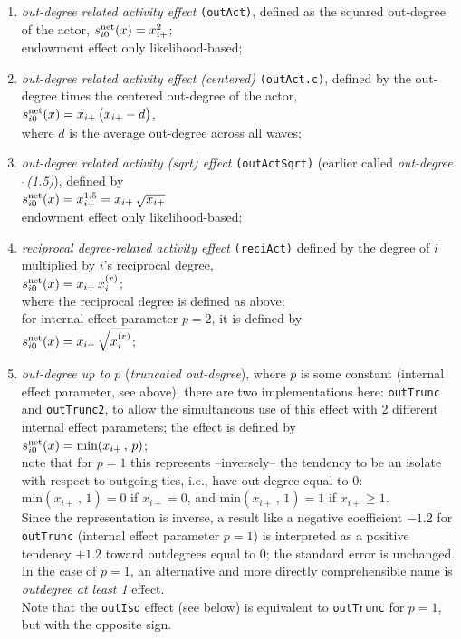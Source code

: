 \documentclass[a4paper,fleqn,11pt]{article}
\newcommand{\+}{\, + \,}
\newcommand{\vit}{\theenumi}
\begin{document}
\begin{enumerate}
 \item {\em out-degree related activity effect} \texttt{(outAct)},
 	 defined as the squared out-degree of the actor,
 $s^{\rm net}_{i\vit}(x) = x^2_{i+}$;\\
 endowment effect only likelihood-based;

 \item {\em out-degree related activity effect (centered)} \texttt{(outAct.c)},
 defined by the out-degree times the centered out-degree of the actor,\\
 $s^{\rm net}_{i\vit}(x) =  x_{i+}\,\big( x_{i+} - d \big)$,\\
 where $d$ is the average out-degree across all waves;

 \item {\em out-degree related activity (sqrt) effect}  \texttt{(outActSqrt)}
 (earlier called {\em out-degree$\,\hat{\ }$(1.5)}), defined by  \\
 $s^{\rm net}_{i\vit}(x) = x^{1.5}_{i+} = x_{i+}\,\sqrt{x_{i+}}$ \\
 endowment effect only likelihood-based;

 \item {\em reciprocal degree-related activity effect} \texttt{(reciAct)}
 defined by the degree of $i$ multiplied by $i$'s reciprocal degree,\\
 $s^{\rm net}_{i\vit}(x) =   x_{i+}\, x^{(r)}_{i} $; \\
 where the reciprocal degree is defined as above;\\
 for internal effect parameter $p=2$, it is defined by\\
 $s^{\rm net}_{i\vit}(x) =   x_{i+}\, \sqrt{x^{(r)}_{i}} $; \\

 \item {\em out-degree up to $p$} (\emph{truncated out-degree}),
 where $p$ is some constant
 (internal effect parameter, see above),  there are two implementations here:
 \texttt{outTrunc} and \texttt{outTrunc2}, to allow the simultaneous use of this
 effect with 2 different internal effect parameters; the effect is
 defined by  \\
 $s^{\rm net}_{i\vit}(x) = \text{min}(x_{i+}\,,\, p)$;\\
 note that for $p=1$ this represents --inversely-- the tendency to be an isolate
 with respect to outgoing ties, i.e., have out-degree equal to 0:
 $ \text{min}(x_{i+}\,,\, 1) = 0$ if $x_{i+} = 0$, and
 $ \text{min}(x_{i+}\,,\, 1) = 1$ if $x_{i+} \geq 1$.\\
 Since the representation is inverse, a result like a negative coefficient
 $ -1.2$ for \texttt{outTrunc} (internal effect parameter $p=1$) is interpreted
 as a positive tendency $+1.2$ toward outdegrees equal to 0; the standard
 error is unchanged. In the case of $p=1$, an alternative and more directly
 comprehensible name is \emph{outdegree at least 1} effect.\\
 Note that the \texttt{outIso} effect (see below) is equivalent
 to \texttt{outTrunc} for $p=1$, but with the opposite sign.


\end{enumerate}
\end{document}
